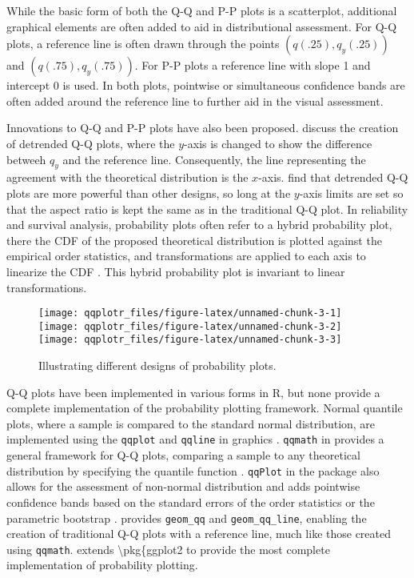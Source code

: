 While the basic form of both the Q-Q and P-P plots is a scatterplot,
additional graphical elements are often added to aid in distributional
assessment. For Q-Q plots, a reference line is often drawn through the
points \((q(.25), q_y(.25))\) and \((q(.75), q_y(.75))\). For P-P plots
a reference line with slope 1 and intercept 0 is used. In both plots,
pointwise or simultaneous confidence bands are often added around the
reference line to further aid in the visual assessment.

Innovations to Q-Q and P-P plots have also been proposed.
\citet{Loy2016-fg} discuss the creation of detrended Q-Q plots, where
the \(y\)-axis is changed to show the difference betweeh \(q_y\) and the
reference line. Consequently, the line representing the agreement with
the theoretical distribution is the \(x\)-axis. \citet{Loy2016-fg} find
that detrended Q-Q plots are more powerful than other designs, so long
at the \(y\)-axis limits are set so that the aspect ratio is kept the
same as in the traditional Q-Q plot. In reliability and survival
analysis, probability plots often refer to a hybrid probability plot,
there the CDF of the proposed theoretical distribution is plotted
against the empirical order statistics, and transformations are applied
to each axis to linearize the CDF \citep[cf.][chapter 6]{Meeker1998}.
This hybrid probability plot is invariant to linear transformations.

\begin{Schunk}
\begin{figure}

{\centering \texttt{[image: qqplotr\_files/figure-latex/unnamed-chunk-3-1]} \texttt{[image: qqplotr\_files/figure-latex/unnamed-chunk-3-2]} \texttt{[image: qqplotr\_files/figure-latex/unnamed-chunk-3-3]} 

}

\caption{\label{fig:pp}Illustrating different designs of probability plots.}\label{fig:unnamed-chunk-3}
\end{figure}
\end{Schunk}

Q-Q plots have been implemented in various forms in R, but none provide
a complete implementation of the probability plotting framework. Normal
quantile plots, where a sample is compared to the standard normal
distribution, are implemented using the \texttt{qqplot} and
\texttt{qqline} in  graphics \citep{R}. \texttt{qqmath} in
 provides a general framework for Q-Q plots, comparing a
sample to any theoretical distribution by specifying the quantile
function \citep{lattice}. \texttt{qqPlot} in the  package also
allows for the assessment of non-normal distribution and adds pointwise
confidence bands based on the standard errors of the order statistics or
the parametric bootstrap \citep{car}.  provides
\texttt{geom\_qq} and \texttt{geom\_qq\_line}, enabling the creation of
traditional Q-Q plots with a reference line, much like those created
using \texttt{qqmath}.  extends
\textbackslash{}pkg\{ggplot2 to provide the most complete implementation
of probability plotting.

